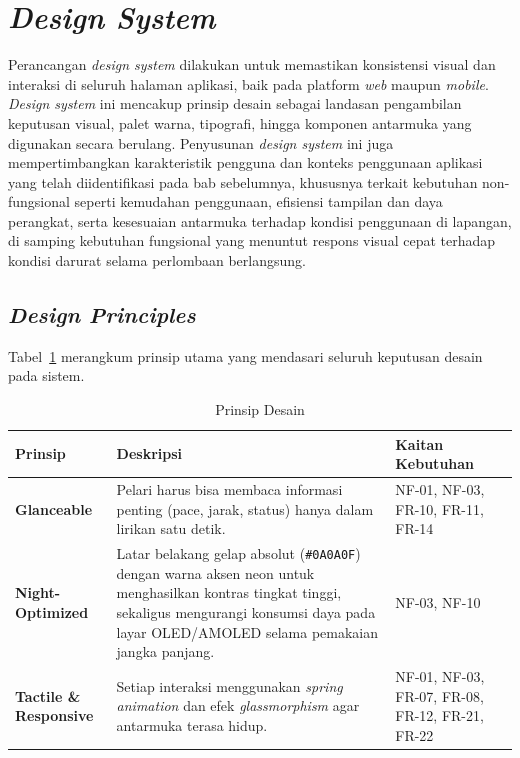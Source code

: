 \section{\textit{Design System}}
\label{sec:design-system}
Perancangan \textit{design system} dilakukan untuk memastikan konsistensi
visual dan interaksi di seluruh halaman aplikasi, baik pada platform
\textit{web} maupun \textit{mobile}. \textit{Design system} ini mencakup
prinsip desain sebagai landasan pengambilan keputusan visual, palet warna,
tipografi, hingga komponen antarmuka yang digunakan secara berulang.
Penyusunan \textit{design system} ini juga mempertimbangkan karakteristik
pengguna dan konteks penggunaan aplikasi yang telah diidentifikasi pada bab sebelumnya, khususnya terkait kebutuhan non-fungsional seperti kemudahan
penggunaan, efisiensi tampilan dan daya perangkat, serta kesesuaian antarmuka terhadap kondisi
penggunaan di lapangan, di samping kebutuhan fungsional yang menuntut respons visual cepat terhadap kondisi darurat selama perlombaan berlangsung.
\subsection{\textit{Design Principles}}
\label{subsec:prinsip-desain}
 
Tabel~\ref{tab:prinsip-desain} merangkum prinsip utama yang mendasari seluruh keputusan desain pada sistem.
 
\begin{table}[H]
    \centering
    \small
    \caption{Prinsip Desain}
    \label{tab:prinsip-desain}
    \begin{tabular}{|>{\bfseries}p{2.6cm}|p{6.2cm}|p{3cm}|}
        \hline
        \textbf{Prinsip} & \textbf{Deskripsi} & \textbf{Kaitan Kebutuhan} \\
        \hline
        Glanceable &
        Pelari harus bisa membaca informasi
        penting (pace, jarak, status) hanya dalam lirikan satu detik. &
        NF-01, NF-03, FR-10, FR-11, FR-14 \\
        \hline
        Night-Optimized &
        Latar belakang gelap absolut (\texttt{\#0A0A0F}) dengan warna aksen
        neon untuk menghasilkan kontras tingkat tinggi, sekaligus mengurangi
        konsumsi daya pada layar OLED/AMOLED selama pemakaian jangka panjang. &
        NF-03, NF-10 \\
        \hline
        Tactile \& Responsive &
        Setiap interaksi menggunakan \textit{spring animation}
        dan efek \textit{glassmorphism} agar antarmuka terasa hidup. &
        NF-01, NF-03, FR-07, FR-08, FR-12, FR-21, FR-22 \\
        \hline
    \end{tabular}
\end{table}

